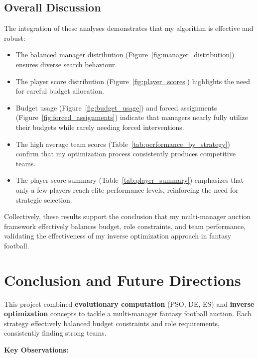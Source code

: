 \documentclass[sigconf]{acmart}
\begin{document}
\subsection{Overall Discussion}
The integration of these analyses demonstrates that my algorithm is effective and robust:
\begin{itemize}
	\item The balanced manager distribution (Figure~\ref{fig:manager_distribution}) ensures diverse search behaviour.
	\item The player score distribution (Figure~\ref{fig:player_scores}) highlights the need for careful budget allocation.
	\item Budget usage (Figure~\ref{fig:budget_usage}) and forced assignments (Figure~\ref{fig:forced_assignments}) indicate that managers nearly fully utilize their budgets while rarely needing forced interventions.
	\item The high average team scores (Table~\ref{tab:performance_by_strategy}) confirm that my optimization process consistently produces competitive teams.
	\item The player score summary (Table~\ref{tab:player_summary}) emphasizes that only a few players reach elite performance levels, reinforcing the need for strategic selection.
\end{itemize}

Collectively, these results support the conclusion that my multi-manager auction framework effectively balances budget, role constraints, and team performance, validating the effectiveness of my inverse optimization approach in fantasy football.


\section{Conclusion and Future Directions}
\label{sec:conclusion}
This project combined \textbf{evolutionary computation} (PSO, DE, ES) and \textbf{inverse optimization} concepts to tackle a multi-manager fantasy football auction. Each strategy effectively balanced budget constraints and role requirements, consistently finding strong teams.

\textbf{Key Observations:}
\end{document}
